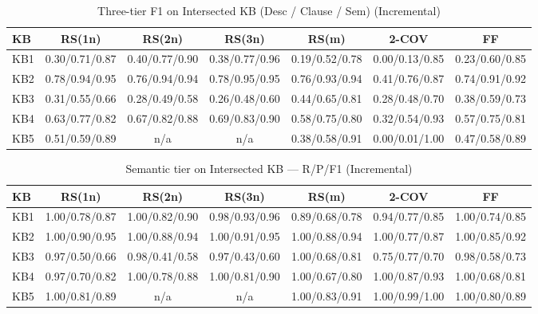 \begin{table}[htbp]
\centering
\caption{Three-tier F1 on Intersected KB (Desc / Clause / Sem) (Incremental)}
\label{tab:three_tier_f1_incremental}
\begin{tabular}{lcccccc}
\toprule
KB & RS(1n) & RS(2n) & RS(3n) & RS(m) & 2-COV & FF \\
\midrule
KB1 & 0.30/0.71/0.87 & 0.40/0.77/0.90 & 0.38/0.77/0.96 & 0.19/0.52/0.78 & 0.00/0.13/0.85 & 0.23/0.60/0.85 \\
KB2 & 0.78/0.94/0.95 & 0.76/0.94/0.94 & 0.78/0.95/0.95 & 0.76/0.93/0.94 & 0.41/0.76/0.87 & 0.74/0.91/0.92 \\
KB3 & 0.31/0.55/0.66 & 0.28/0.49/0.58 & 0.26/0.48/0.60 & 0.44/0.65/0.81 & 0.28/0.48/0.70 & 0.38/0.59/0.73 \\
KB4 & 0.63/0.77/0.82 & 0.67/0.82/0.88 & 0.69/0.83/0.90 & 0.58/0.75/0.80 & 0.32/0.54/0.93 & 0.57/0.75/0.81 \\
KB5 & 0.51/0.59/0.89 & n/a & n/a & 0.38/0.58/0.91 & 0.00/0.01/1.00 & 0.47/0.58/0.89 \\
\bottomrule
\end{tabular}
\end{table}

\begin{table}[htbp]
\centering
\caption{Semantic tier on Intersected KB — R/P/F1 (Incremental)}
\label{tab:semantic_prf_incremental}
\begin{tabular}{lcccccc}
\toprule
KB & RS(1n) & RS(2n) & RS(3n) & RS(m) & 2-COV & FF \\
\midrule
KB1 & 1.00/0.78/0.87 & 1.00/0.82/0.90 & 0.98/0.93/0.96 & 0.89/0.68/0.78 & 0.94/0.77/0.85 & 1.00/0.74/0.85 \\
KB2 & 1.00/0.90/0.95 & 1.00/0.88/0.94 & 1.00/0.91/0.95 & 1.00/0.88/0.94 & 1.00/0.77/0.87 & 1.00/0.85/0.92 \\
KB3 & 0.97/0.50/0.66 & 0.98/0.41/0.58 & 0.97/0.43/0.60 & 1.00/0.68/0.81 & 0.75/0.77/0.70 & 0.98/0.58/0.73 \\
KB4 & 0.97/0.70/0.82 & 1.00/0.78/0.88 & 1.00/0.81/0.90 & 1.00/0.67/0.80 & 1.00/0.87/0.93 & 1.00/0.68/0.81 \\
KB5 & 1.00/0.81/0.89 & n/a & n/a & 1.00/0.83/0.91 & 1.00/0.99/1.00 & 1.00/0.80/0.89 \\
\bottomrule
\end{tabular}
\end{table}

